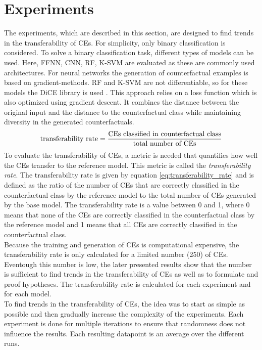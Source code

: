 \documentclass{article}
\begin{document}
\section{Experiments}
The experiments, which are described in this section, are designed to find trends in the transferability of CEs. For simplicity, only binary classification is considered. To solve a binary classification task, different types of models can be used. Here, FFNN, CNN, RF, K-SVM are evaluated as these are commonly used architectures. For neural networks the generation of counterfactual examples is based on gradient-methods. RF and K-SVM are not differentiable, so for these models the DiCE library is used \cite{dice_cf}. This approach relies on a loss function which is also optimized using gradient descent. It combines the distance between the original input and the distance to the counterfactual class while maintaining diversity in the generated counterfactuals. \\
\begin{equation}
    \text{transferability rate} = \frac{\text{CEs classified in counterfactual class}}{\text{total number of CEs}}
    \label{eq:transferability_rate}
    \vspace{0.5cm}
\end{equation}
\noindent
To evaluate the transferability of CEs, a metric is needed that quantifies how well the CEs transfer to the reference model. This metric is called the \textit{transferability rate}. The transferability rate is given by equation \ref{eq:transferability_rate} and is defined as the ratio of the number of CEs that are correctly classified in the counterfactual class by the reference model to the total number of CEs generated by the base model. The transferability rate is a value between 0 and 1, where 0 means that none of the CEs are correctly classified in the counterfactual class by the reference model and 1 means that all CEs are correctly classified in the counterfactual class.\\
Because the training and generation of CEs is computational expensive, the transferability rate is only calculated for a limited number (250) of CEs. Eventough this number is low, the later presented results show that the number is sufficient to find trends in the transferability of CEs as well as to formulate and proof hypotheses. The transferability rate is calculated for each experiment and for each model.\\
To find trends in the transferability of CEs, the idea was to start as simple as possible and then gradually increase the complexity of the experiments. Each experiment is done for multiple iterations to ensure that randomness does not influence the results. Each resulting datapoint is an average over the different runs.
\end{document}
